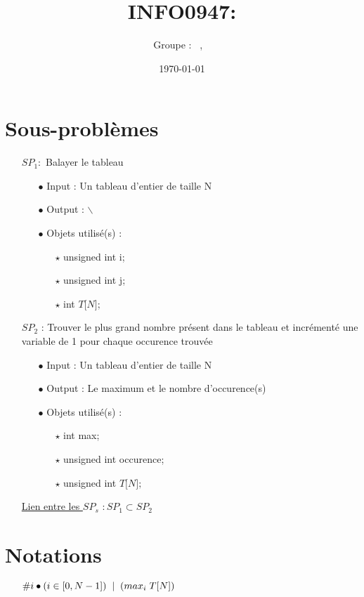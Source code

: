 \documentclass[a4paper, 11pt, oneside]{article}
\title{INFO0947: \intitule}
\author{Groupe \GrNbr : \PrenomUN~\textsc{\NomUN}, \PrenomDEUX~\textsc{\NomDEUX}}
\date{\today}
\newcommand{\tablemat}{~}
\renewcommand{\tablemat}{\tableofcontents}
\begin{document}
\maketitle
\newpage
\tablemat
\newpage

\section{Sous-problèmes}
\begin{itemize}
	\item[] $SP_1 :$ Balayer le tableau
	\begin{itemize}
		\item[\small $\bullet$] Input : Un tableau d'entier de taille N
		\item[\small $\bullet$] Output : $\backslash$
		\item[\small $\bullet$] Objets utilisé(s) : 
		\begin{itemize}
			\item[$\star$] unsigned int i;
			\item[$\star$] unsigned int j;
			\item[$\star$] int $T\lbrack N \rbrack;$
		\end{itemize}
	\end{itemize}
	\medskip
	\item[] $SP_2$ : Trouver le plus grand nombre présent dans le tableau et incrémenté une variable 
				   de 1 pour chaque occurence trouvée
	\begin{itemize}
		\item[\small $\bullet$] Input : Un tableau d'entier de taille N
		\item[\small $\bullet$] Output : Le maximum et le nombre d'occurence(s)
		\item[\small $\bullet$] Objets utilisé(s) : 
		\begin{itemize}
			\item[$\star$] int max;
			\item[$\star$] unsigned int occurence;
			\item[$\star$] unsigned int $T\lbrack N \rbrack;$ 
		\end{itemize}
	\end{itemize}
	\medskip
	\item[] \underline{Lien entre les $SP_s$} $: SP_1 \subset SP_2$
\end{itemize}

\section{Notations}
\begin{itemize}
	\item[] $\#i \bullet (i \in \lbrack 0, N-1 \rbrack) \hspace{1mm} \mid \hspace{1mm} (max_i \hspace{1mm} T\lbrack N \rbrack)$
\end{itemize}
\end{document}
